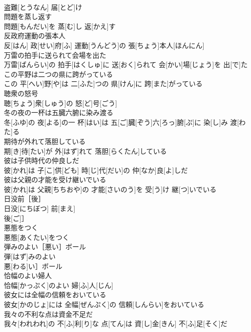 \documentclass[8pt]{extreport}
\begin{document}
\begin{CJK}{UTF8}{min}
\\	盗難[とうなん] 届[とど]け
\\	問題を蒸し返す	
\\	問題[もんだい]を 蒸[む]し 返[かえ]す
\\	反政府運動の張本人	
\\	反[はん] 政[せい]府[ふ] 運動[うんどう]の 張[ちょう]本人[ほんにん]
\\	万雷の拍手に送られて会場を出た	
\\	万雷[ばんらい]の 拍手[はくしゅ]に 送[おく]られて 会[かい]場[じょう]を 出[で]た
\\	この平野は二つの県に跨がっている	
\\	この 平[へい]野[や]は 二[ふた]つの 県[けん]に 跨[また]がっている
\\	聴衆の怒号	
\\	聴[ちょう]衆[しゅう]の 怒[ど]号[ごう]
\\	冬の夜の一杯は五臓六腑に染み渡る	
\\	冬[ふゆ]の 夜[よる]の一 杯[はい]は 五[ご]臓[ぞう]六[ろっ]腑[ぷ]に 染[し]み 渡[わた]る
\\	期待が外れて落胆している	
\\	期[き]待[たい]が 外[はず]れて 落胆[らくたん]している
\\	彼は子供時代の仲良しだ	
\\	彼[かれ]は 子[こ]供[ども] 時[じ]代[だい]の 仲[なか]良[よ]しだ
\\	彼は父親の才能を受け継いでいる	
\\	彼[かれ]は 父親[ちちおや]の 才能[さいのう]を 受[う]け 継[つ]いでいる
\\	日没前［後］	
\\	日没[にちぼつ] 前[まえ]
\\	後[ご]］
\\	悪態をつく	
\\	悪態[あくたい]をつく
\\	弾みのよい［悪い］ボール	
\\	弾[はず]みのよい
\\	悪[わる]い］ボール
\\	恰幅のよい婦人	
\\	恰幅[かっぷく]のよい 婦[ふ]人[じん]
\\	彼女には全幅の信頼をおいている	
\\	彼女[かのじょ]には 全幅[ぜんぷく]の 信頼[しんらい]をおいている
\\	我々の不利な点は資金不足だ	
\\	我々[われわれ]の 不[ふ]利[り]な 点[てん]は 資[し]金[きん] 不[ふ]足[そく]だ

\end{CJK}
\end{document}
